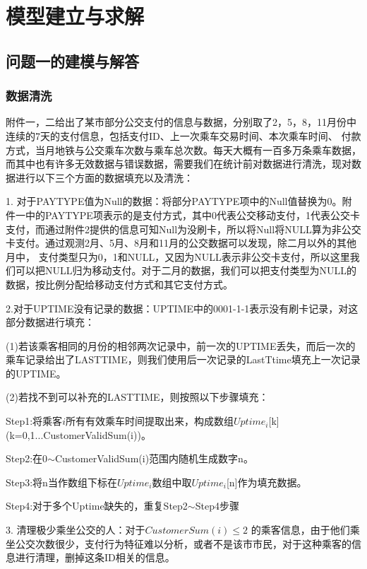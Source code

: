 \documentclass[withoutpreface,bwprint]{cumcmthesis} %
\begin{document}
\section{模型建立与求解}
\subsection{问题一的建模与解答}
\subsubsection{数据清洗}
附件一，二给出了某市部分公交支付的信息与数据，分别取了2，5，8，11月份中连续的7天的支付信息，包括支付ID、上一次乘车交易时间、本次乘车时间、
付款方式，当月地铁与公交乘车次数与乘车总次数。每天大概有一百多万条乘车数据，而其中也有许多无效数据与错误数据，需要我们在统计前对数据进行清洗，现对数据进行以下三个方面的数据填充以及清洗：

1. 对于PAYTYPE值为Null的数据：将部分PAYTYPE项中的Null值替换为0。附件一中的PAYTYPE项表示的是支付方式，其中0代表公交移动支付，1代表公交卡支付，而通过附件2提供的信息可知Null为没刷卡，所以将Null将NULL算为非公交卡支付。通过观测2月、5月、8月和11月的公交数据可以发现，除二月以外的其他月中，
支付类型只为0，1和NULL，又因为NULL表示非公交卡支付，所以这里我们可以把NULL归为移动支付。对于二月的数据，我们可以把支付类型为NULL的数据，按比例分配给移动支付方式和其它支付方式。

2.对于UPTIME没有记录的数据：UPTIME中的0001-1-1表示没有刷卡记录，对这部分数据进行填充：

(1)若该乘客相同的月份的相邻两次记录中，前一次的UPTIME丢失，而后一次的乘车记录给出了LASTTIME，则我们使用后一次记录的LastTtime填充上一次记录的UPTIME。

(2)若找不到可以补充的LASTTIME，则按照以下步骤填充：

Step1:将乘客$i$所有有效乘车时间提取出来，构成数组$Uptime_i$[k](k=0,1...CustomerValidSum(i))。

Step2:在0$\sim$CustomerValidSum(i)范围内随机生成数字n。

Step3:将n当作数组下标在$Uptime_i$数组中取$Uptime_i$[n]作为填充数据。

Step4:对于多个Uptime缺失的，重复Step2$\sim$Step4步骤

3. 清理极少乘坐公交的人：对于$CustomerSum(i)\leq2$ 的乘客信息，由于他们乘坐公交次数很少，支付行为特征难以分析，或者不是该市市民，对于这种乘客的信息进行清理，删掉这条ID相关的信息。

\end{document}
